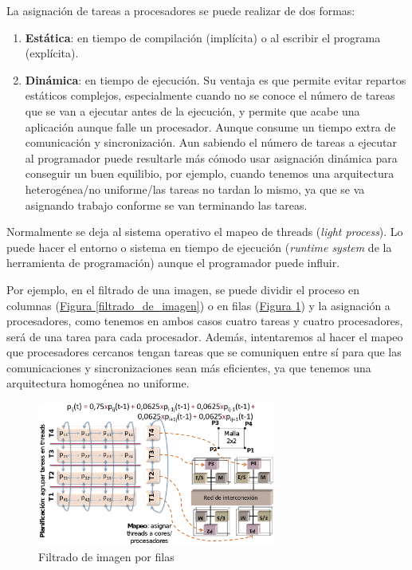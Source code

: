 \documentclass[10pt,a4paper,spanish]{report}
\begin{document}
La asignación de tareas a procesadores se puede realizar de dos formas:
\begin{enumerate}[\color{azul}{\bf $\heartsuit$}]
    \item \textcolor[rgb]{0.2,0.4,0.8}{\textbf{Estática}}: en tiempo de compilación (implícita) o al escribir el programa (explícita).
    \item \textcolor[rgb]{0.2,0.4,0.8}{\textbf{Dinámica}}: en tiempo de ejecución. Su ventaja es que permite evitar repartos estáticos complejos, especialmente cuando no se conoce el número de tareas que se van a ejecutar antes de la ejecución, y permite que acabe una aplicación aunque falle un procesador. Aunque consume un tiempo extra de comunicación y sincronización. Aun sabiendo el número de tareas a ejecutar al programador puede resultarle más cómodo usar asignación dinámica para conseguir un buen equilibio, por ejemplo, cuando tenemos una arquitectura heterogénea/no uniforme/las tareas no tardan lo mismo, ya que se va asignando trabajo conforme se van terminando las tareas.
\end{enumerate}

Normalmente se deja al sistema operativo el mapeo de threads (\textcolor[rgb]{0.2,0.4,0.8}{\textit{light process}}). Lo puede hacer el entorno o sistema en tiempo de ejecución (\textcolor[rgb]{0.2,0.4,0.8}{\textit{runtime system}} de la herramienta de programación) aunque el programador puede influir.

Por ejemplo, en el filtrado de una imagen, se puede dividir el proceso en columnas (\hyperref[filtrado_de_imagen]{Figura \ref*{filtrado_de_imagen}}) o en filas (\hyperref[fil_img_filas]{Figura \ref*{fil_img_filas}}) y la asignación a procesadores, como tenemos en ambos casos cuatro tareas y cuatro procesadores, será de una tarea para cada procesador. Además, intentaremos al hacer el mapeo que procesadores cercanos tengan tareas que se comuniquen entre sí para que las comunicaciones y sincronizaciones sean más eficientes, ya que tenemos una arquitectura homogénea no uniforme.

\begin{figure}[!h]
\centering
\includegraphics[width=0.7\textwidth]{42}
\caption{Filtrado de imagen por filas}
\label{fil_img_filas}
\end{figure}
\end{document}

